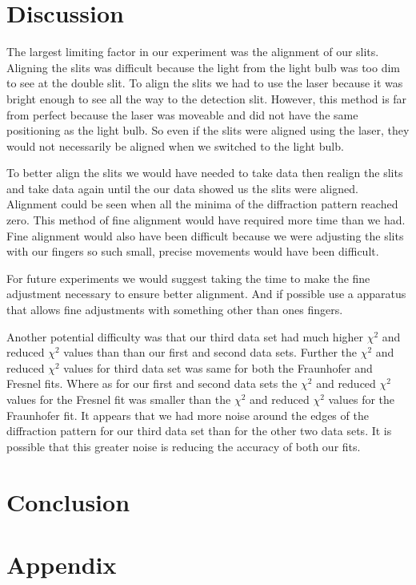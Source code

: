 \documentclass[prb,preprint]{revtex4-1}
\begin{document}
\section{Discussion}

The largest limiting factor in our experiment was the alignment of our slits. Aligning the slits was difficult because the light from the light bulb was too dim to see at the double slit. To align the slits we had to use the laser because it was bright enough to see all the way to the detection slit. However, this method is far from perfect because the laser was moveable and did not have the same positioning as the light bulb. So even if the slits were aligned using the laser, they would not necessarily be aligned when we switched to the light bulb.

To better align the slits we would have needed to take data then realign the slits and take data again until the our data showed us the slits were aligned. Alignment could be seen when all the minima of the diffraction pattern reached zero. This method of fine alignment would have required more time than we had. Fine alignment would also have been difficult because we were adjusting the slits with our fingers so such small, precise movements would have been difficult.

For future experiments we would suggest taking the time to make the fine adjustment necessary to ensure better alignment. And if possible use a apparatus that allows fine adjustments with something other than ones fingers.

Another potential difficulty was that our third data set had much higher $\chi^2$ and reduced $\chi^2$ values than than our first and second data sets. Further the $\chi^2$ and reduced $\chi^2$ values for third data set was same for both the Fraunhofer and Fresnel fits. Where as for our first and second data sets the $\chi^2$ and reduced $\chi^2$ values for the Fresnel fit was smaller than the $\chi^2$ and reduced $\chi^2$ values for the Fraunhofer fit. It appears that we had more noise around the edges of the diffraction pattern for our third data set than for the other two data sets. It is possible that this greater noise is reducing the accuracy of both our fits.

\section{Conclusion}

\section{Appendix}
\end{document}
